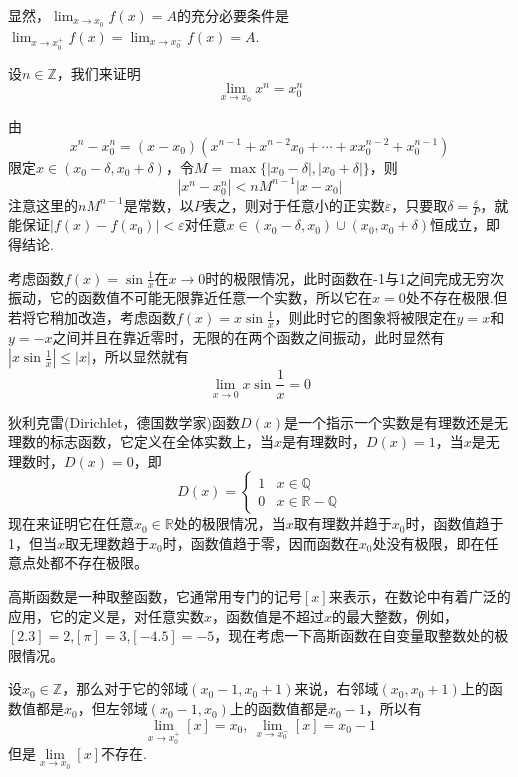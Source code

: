   显然，$\lim_{x \to x_0} f(x) = A$的充分必要条件是 $\lim_{x \to x_0^+} f(x) = \lim_{x \to x_0^-} f(x) = A$.
 
\begin{example}
  \label{example:limit-of-x-power-integer}
  设$n \in \mathbb{Z}$，我们来证明
  \[ \lim_{x \to x_0} x^n = x_0^n \]

  由
  \[ x^n-x_0^n = (x-x_0)(x^{n-1}+x^{n-2}x_0+\cdots+xx_0^{n-2}+x_0^{n-1}) \]
  限定$x \in (x_0-\delta,x_0+\delta)$，令$M=\max\{|x_0-\delta|,|x_0+\delta|\}$，则
  \[ |x^n-x_0^n| < nM^{n-1}|x-x_0| \]
  注意这里的$nM^{n-1}$是常数，以$P$表之，则对于任意小的正实数$\varepsilon$，只要取$\delta=\frac{\varepsilon}{P}$，就能保证$|f(x)-f(x_0)|<\varepsilon$对任意$x \in (x_0-\delta,x_0)\cup(x_0,x_0+\delta)$恒成立，即得结论.
\end{example}

\begin{example}
  \label{example:limit-of-sin-1-over-x-at-0}
  考虑函数$f(x)=\sin{\frac{1}{x}}$在$x \to 0$时的极限情况，此时函数在-1与1之间完成无穷次振动，它的函数值不可能无限靠近任意一个实数，所以它在$x=0$处不存在极限.但若将它稍加改造，考虑函数$f(x)=x\sin{\frac{1}{x}}$，则此时它的图象将被限定在$y=x$和$y=-x$之间并且在靠近零时，无限的在两个函数之间振动，此时显然有$|x\sin{\frac{1}{x}}|\leqslant |x|$，所以显然就有
  \[ \lim_{x \to 0} x \sin{\frac{1}{x}} = 0 \]
\end{example}

\begin{example}
  \label{example:limit-of-dirichlet-function}
  狄利克雷(Dirichlet，德国数学家)函数$D(x)$是一个指示一个实数是有理数还是无理数的标志函数，它定义在全体实数上，当$x$是有理数时，$D(x)=1$，当$x$是无理数时，$D(x)=0$，即
  \[
    D(x) =
    \begin{cases}
      1 & x \in \mathbb{Q} \\
      0 & x \in \mathbb{R}-\mathbb{Q}
    \end{cases}
  \]
  现在来证明它在任意$x_0 \in \mathbb{R}$处的极限情况，当$x$取有理数并趋于$x_0$时，函数值趋于1，但当$x$取无理数趋于$x_0$时，函数值趋于零，因而函数在$x_0$处没有极限，即在任意点处都不存在极限。
\end{example}

  \begin{example}
    \label{example:single-limits-of-gausse-function}
    高斯函数是一种取整函数，它通常用专门的记号$[x]$来表示，在数论中有着广泛的应用，它的定义是，对任意实数$x$，函数值是不超过$x$的最大整数，例如，$[2.3]=2$,$[\pi]=3$,$[-4.5]=-5$，现在考虑一下高斯函数在自变量取整数处的极限情况。

    设$x_0 \in \mathbb{Z}$，那么对于它的邻域$(x_0-1,x_0+1)$来说，右邻域$(x_0,x_0+1)$上的函数值都是$x_0$，但左邻域$(x_0-1,x_0)$上的函数值都是$x_0-1$，所以有
    \[ \lim_{x \to x_0^+} [x] = x_0, \  \lim_{x \to x_0^-} [x] = x_0-1 \]
    但是$\lim\limits_{x \to x_0}[x]$不存在. 
\end{example}

